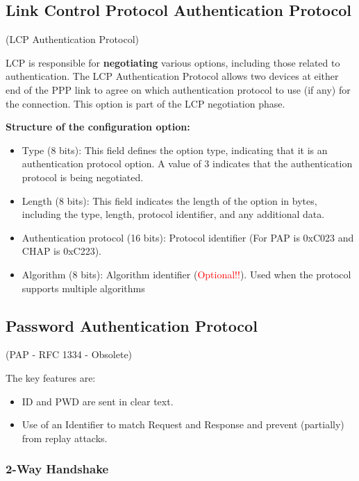 \subsection{Link Control Protocol Authentication Protocol}
\begin{center}
    (LCP Authentication Protocol)
\end{center}
LCP is responsible for \textbf{negotiating} various options, including those related to authentication. The LCP Authentication Protocol allows two devices at either end of the PPP link to agree on which authentication protocol to use (if any) for the connection. This option is part of the LCP negotiation phase. 

\clearpage
\textbf{Structure of the configuration option:}
\begin{itemize}
    \item Type (8 bits): This field defines the option type, indicating that it is an authentication protocol option. A value of 3 indicates that the authentication protocol is being negotiated.
    \item Length (8 bits): This field indicates the length of the option in bytes, including the type, length, protocol identifier, and any additional data.
    \item Authentication protocol (16 bits): Protocol identifier (For PAP is 0xC023 and CHAP is 0xC223).
    \item Algorithm (8 bits): Algorithm identifier (\textcolor{red}{Optional!!}). Used when the protocol supports multiple algorithms
\end{itemize}

\subsection{Password Authentication Protocol}
\begin{center}
    (PAP - RFC 1334 - Obsolete)
\end{center}
The key features are: 
\begin{itemize}
    \item ID and PWD are sent in clear text.
    \item Use of an Identifier to match Request and Response and prevent (partially) from replay attacks.
\end{itemize}

\subsubsection*{2-Way Handshake}

